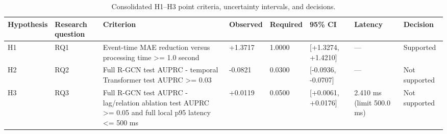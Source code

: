 \begin{table}
\caption{Consolidated H1–H3 point criteria, uncertainty intervals, and decisions.}
\label{tab:hypothesis-evaluation}
\begin{tabular}{llllllll}
\toprule
Hypothesis & Research question & Criterion & Observed & Required & 95\% CI & Latency & Decision \\
\midrule
H1 & RQ1 & Event-time MAE reduction versus processing time >= 1.0 second & +1.3717 & 1.0000 & [+1.3274, +1.4210] & — & Supported \\
H2 & RQ2 & Full R-GCN test AUPRC - temporal Transformer test AUPRC >= 0.03 & -0.0821 & 0.0300 & [-0.0936, -0.0707] & — & Not supported \\
H3 & RQ3 & Full R-GCN test AUPRC - lag/relation ablation test AUPRC >= 0.05 and full local p95 latency <= 500 ms & +0.0119 & 0.0500 & [+0.0061, +0.0176] & 2.410 ms (limit 500.0 ms) & Not supported \\
\bottomrule
\end{tabular}
\end{table}
